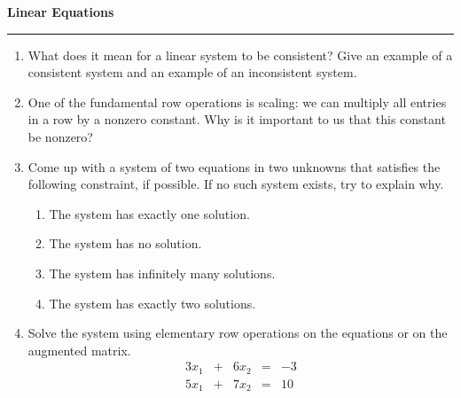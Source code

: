 \documentclass[12pt]{article}
\begin{document}
\begin{center}
{\bf \Large Linear Equations}
\vspace{0.2cm}
\hrule
\end{center}

\begin{multicols*}{2}
	\begin{enumerate}
		\item What does it mean for a linear system to be consistent? Give an example of a consistent system and an example of an inconsistent system.
		\vfill

		\item One of the fundamental row operations is scaling: we can multiply all entries in a row by a nonzero constant. Why is it important to us that this constant be nonzero?

		\vfill

		\item Come up with a system of two equations in two unknowns that satisfies the following constraint, if possible. If no such system exists, try to explain why.
		\begin{enumerate}
			\item The system has exactly one solution.
			\vfill
			\item The system has no solution.
			\vfill
			\item The system has infinitely many solutions.
			\vfill
			\item The system has exactly two solutions.
			\vfill\null
		\end{enumerate}
		\columnbreak
		\item Solve the system using elementary row operations on the equations or on the augmented matrix.
		\[
		\begin{array}{ccccc}
			3x_1 &+&6x_2&=&-3\\
			5x_1&+&7x_2&=&10
		\end{array}
		\]
		\vfill


\end{enumerate}
\end{multicols*}
\end{document}
